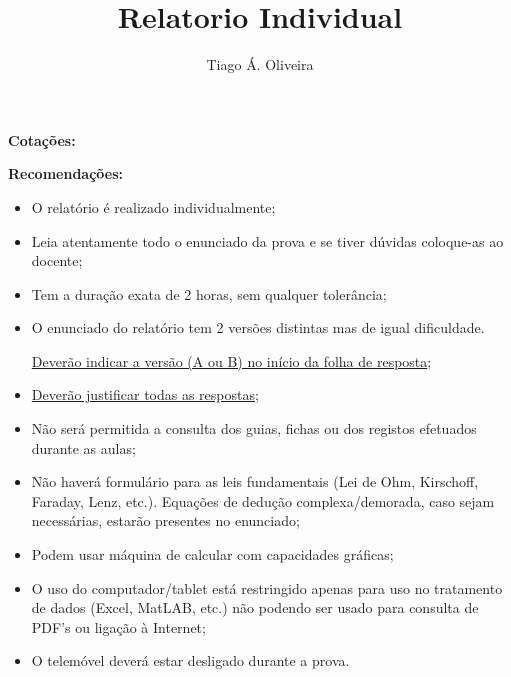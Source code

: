 \documentclass[11pt,a4paper,final,addpoints]{exam}
\author{Tiago Á. Oliveira}
\title{Relatorio Individual}
\begin{document}
\boxedpoints
\pointsinmargin

\ifprintanswers
\noindent\textbf{Cota\c{c}\~{o}es:}
\begin{center}
\gradetable[h][questions]
\linebreak
\end{center}
\else
\begin{center}
\end{center}

\noindent\textbf{Recomenda\c{c}\~{o}es:}
\begin{itemize}
\item O relat\'{o}rio \'{e} realizado individualmente;

\item Leia atentamente todo o enunciado da prova e se tiver d\'{u}vidas coloque-as ao docente;

\item Tem a dura\c{c}\~{a}o exata de 2 horas, sem qualquer toler\^{a}ncia;

\item O enunciado do relat\'{o}rio tem 2 vers\~{o}es distintas mas de igual dificuldade. 

\underline{Dever\~{a}o indicar a vers\~{a}o (A ou B) no in\'{i}cio da folha de resposta};

\item \underline{Dever\~{a}o justificar todas as respostas};

\item N\~{a}o ser\'{a} permitida a consulta dos guias, fichas ou dos registos efetuados durante as aulas;

\item N\~{a}o haver\'{a} formul\'{a}rio para as leis fundamentais (Lei de Ohm, Kirschoff, Faraday, Lenz, etc.). Equa\c{c}\~{o}es de dedu\c{c}\~{a}o complexa/demorada, caso sejam necess\'{a}rias, estar\~{a}o presentes no enunciado;

\item Podem usar m\' {a}quina de calcular com capacidades gr\'{a}ficas;

\item O uso do computador/tablet est\'{a} restringido apenas para uso no tratamento de dados (Excel, MatLAB, etc.) n\~{a}o podendo ser usado para consulta de PDF's ou liga\c{c}\~{a}o \`{a} Internet;

\item O telem\'{o}vel dever\'{a} estar desligado durante a prova.
\end{itemize}
\end{document}
